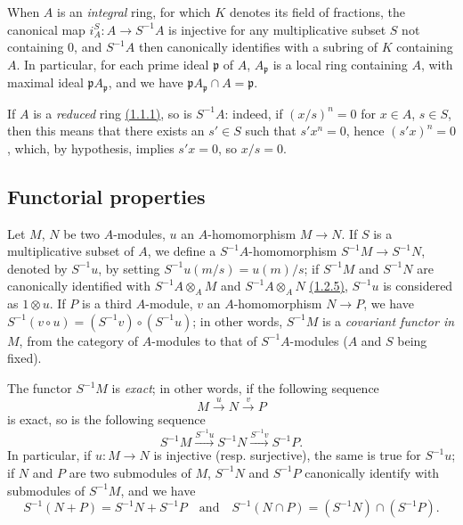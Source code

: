 \begin{env}[1.2.7]
\label{env-0.1.2.7}
When $A$ is an {\em integral} ring, for which $K$ denotes its field of
fractions, the canonical map $i_A^S:A\to S^{-1}A$ is injective for any
multiplicative subset $S$ not containing $0$, and $S^{-1}A$ then canonically
identifies with a subring of $K$ containing $A$. In particular, for each prime
ideal $\mathfrak{p}$ of $A$, $A_\mathfrak{p}$ is a local ring containing $A$,
with maximal ideal $\mathfrak{p}A_\mathfrak{p}$, and we have
$\mathfrak{p}A_\mathfrak{p}\cap A=\mathfrak{p}$.
\end{env}

\begin{env}[1.2.8]
\label{env-0.1.2.8}
If $A$ is a {\em reduced} ring \hyperref[env-0.1.1.1]{(1.1.1)}, so is $S^{-1}A$: indeed, if
$(x/s)^n=0$ for $x\in A$, $s\in S$, then this means that there exists an
$s'\in S$ such that $s' x^n=0$, hence $(s' x)^n=0$, which, by hypothesis, implies
$s' x=0$, so $x/s=0$.
\end{env}

\subsection{Functorial properties}
\label{subsection-func-prop-ring-of-fractions}

\begin{env}[1.3.1]
\label{env-0.1.3.1}
Let $M$, $N$ be two $A$-modules, $u$ an $A$-homomorphism $M\to N$. If $S$ is a
multiplicative subset of $A$, we define a $S^{-1}A$-homomorphism
$S^{-1}M\to S^{-1}N$, denoted by $S^{-1}u$, by setting $S^{-1}u(m/s)=u(m)/s$; if
$S^{-1}M$ and $S^{-1}N$ are canonically identified with $S^{-1}A\otimes_A M$ and
$S^{-1}A\otimes_A N$ \hyperref[env-0.1.2.5]{(1.2.5)}, $S^{-1}u$ is considered as $1\otimes u$.
If $P$ is a third $A$-module, $v$ an $A$-homomorphism $N\to P$, we have
$S^{-1}(v\circ u)=(S^{-1}v)\circ(S^{-1}u)$; in other words, $S^{-1}M$ is a
{\em covariant functor in $M$}, from the category of $A$-modules to that of
$S^{-1}A$-modules ($A$ and $S$ being fixed).
\end{env}

\begin{env}[1.3.2]
\label{env-0.1.3.2}
The functor $S^{-1}M$ is {\em exact}; in other words, if the following sequence
\[
  M\xrightarrow{u}N\xrightarrow{v}P
\]
is exact, so is the following sequence
\[
  S^{-1}M\xrightarrow{S^{-1}u}S^{-1}N\xrightarrow{S^{-1}v}S^{-1}P.
\]
In particular, if $u:M\to N$ is injective (resp. surjective), the same is true
for $S^{-1}u$;
if $N$ and $P$ are two submodules of $M$, $S^{-1}N$ and $S^{-1}P$ canonically
identify with submodules of $S^{-1}M$, and we have
\[
  S^{-1}(N+P)=S^{-1}N+S^{-1}P
  \quad\text{and}\quad
  S^{-1}(N\cap P)=(S^{-1}N)\cap(S^{-1}P).
\]
\end{env}

